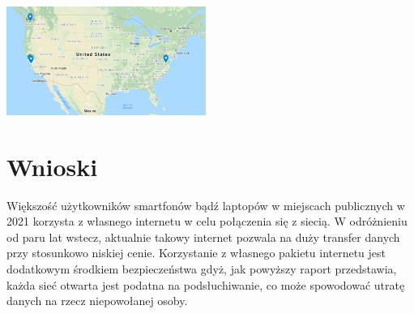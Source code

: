 \documentclass[12pt,a4paper]{article}
\begin{document}
\begin{multicols}{2}
\begin{center}
                \includegraphics[width=6.5cm]{KD_map_us}\\
            \end{center}
        \end{multicols}
    \section{Wnioski}
        Większość użytkowników smartfonów bądź laptopów w miejscach publicznych w 2021 korzysta z własnego internetu w celu połączenia się z siecią. W odróżnieniu od paru lat wstecz, aktualnie takowy internet pozwala na duży transfer danych przy stosunkowo niskiej cenie. Korzystanie z własnego pakietu internetu jest dodatkowym środkiem bezpieczeństwa gdyż, jak powyższy raport przedstawia, każda sieć otwarta jest podatna na podsłuchiwanie, co może spowodować utratę danych na rzecz niepowołanej osoby.
\end{document}
